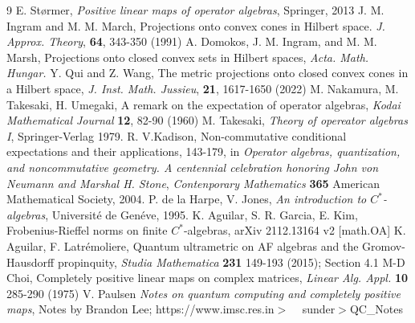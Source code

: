 \documentclass{amsart}
\theoremstyle{plain}
\theoremstyle{definition}
\begin{document}
\begin{thebibliography}{9}
 E. St{\o}rmer, \textit{Positive linear maps of operator algebras}, Springer, 2013
  J. M. Ingram and M. M. March, Projections onto convex cones in Hilbert space. \textit{ J. Approx. Theory}, \textbf{64}, 343-350 (1991)
 A. Domokos, J. M. Ingram, and M. M. Marsh, Projections onto closed convex sets in Hilbert spaces, \textit{Acta. Math. Hungar.}
 Y. Qui and Z. Wang, The metric projections onto closed convex cones in a Hilbert space, \textit{J. Inst. Math. Jussieu}, \textbf{21}, 1617-1650 (2022) 
 M. Nakamura, M. Takesaki, H. Umegaki, A remark on the expectation of operator algebras, \textit{Kodai Mathematical Journal}  \textbf{12}, 82-90 (1960)
 M. Takesaki, \textit{ Theory of opereator algebras I}, Springer-Verlag 1979.
 R. V.Kadison, Non-commutative conditional expectations and their applications, 143-179,  in \textit{Operator algebras, quantization, and noncommutative geometry. A centennial celebration honoring John von Neumann and Marshal H. Stone}, \textit{Contenporary Mathematics} \textbf{365} American Mathematical Society, 2004.
 P. de la Harpe, V. Jones, \textit{An introduction to $C^*$-algebras}, Universit\'e de Gen\'eve, 1995.
 K. Aguilar, S. R. Garcia, E. Kim, Frobenius-Rieffel norms on finite $C^*$-algebras, arXiv 2112.13164 v2 [math.OA]
 K. Aguilar, F. Latr\'emoliere, Quantum ultrametric on AF algebras and the Gromov-Hausdorff propinquity, \textit{Studia Mathematica} \textbf{231} 149-193 (2015); Section 4.1
 M-D Choi, Completely positive linear maps on complex matrices,  \textit{Linear Alg. Appl.} \textbf{10} 285-290 (1975)
 V.  Paulsen \textit{Notes on quantum computing and completely positive maps}, Notes by Brandon Lee; https://www.imsc.res.in$>$ ~ sunder$>$QC\_Notes

\end{thebibliography}





\end{document}
